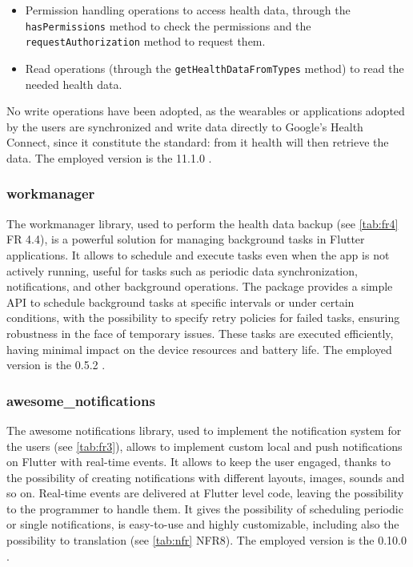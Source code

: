 \begin{itemize}[nosep] %
    \item Permission handling operations to access health data, through the \texttt{hasPermissions} method to check the permissions and the \texttt{requestAuthorization} method to request them.
    \item Read operations (through the \texttt{getHealthDataFromTypes} method) to read the needed health data.
\end{itemize}

\noindent No write operations have been adopted, as the wearables or applications adopted by the users are synchronized and write data directly to Google's Health Connect, since it constitute the standard: from it health will then retrieve the data. The employed version is the 11.1.0 \cite{Health}.

\subsubsection{workmanager}
The workmanager library, used to perform the health data backup (see \cref{tab:fr4} FR 4.4), is a powerful solution for managing background tasks in Flutter applications. It allows to schedule and execute tasks even when the app is not actively running, useful for tasks such as periodic data synchronization, notifications, and other background operations. The package provides a simple API to schedule background tasks at specific intervals or under certain conditions, with the possibility to specify retry policies for failed tasks, ensuring robustness in the face of temporary issues. These tasks are executed efficiently, having minimal impact on the device resources and battery life. The employed version is the 0.5.2 \cite{Workmanager}.
\subsubsection{awesome\_notifications}
The awesome notifications library, used to implement the notification system for the users (see \cref{tab:fr3}), allows to implement custom local and push notifications on Flutter with real-time events. It allows to keep the user engaged, thanks to the possibility of creating notifications with different layouts, images, sounds and so on. Real-time events are delivered at Flutter level code, leaving the possibility to the programmer to handle them. It gives the possibility of scheduling periodic or single notifications, is easy-to-use and highly customizable, including also the possibility to translation (see \cref{tab:nfr} NFR8). The employed version is the 0.10.0 \cite{AwesomeNotifications}.
